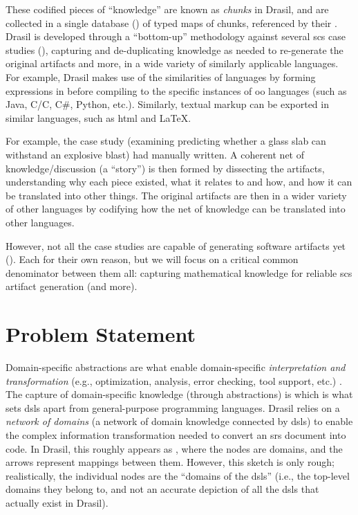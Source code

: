 
These codified pieces of ``knowledge'' are known as \textit{chunks} in Drasil,
and are collected in a single database () of typed
maps of chunks, referenced by their . Drasil is developed through a
``bottom-up'' methodology against several \acs{scs} case studies
(), capturing and de-duplicating knowledge as needed to
re-generate the original artifacts and more, in a wide variety of similarly
applicable languages. For example, Drasil makes use of the similarities of
 languages by forming expressions in  before compiling to the
specific instances of \acs{oo} languages (such as Java, C/C\+\+, C\#, Python,
etc.). Similarly, textual markup can be exported in similar languages, such as
\acs{html} and \LaTeX{}.

For example, the  case study (examining predicting whether a glass
slab can withstand an explosive blast) had 
manually written. A coherent net of knowledge/discussion (a ``story'') is then
formed by dissecting the artifacts, understanding why each piece existed, what
it relates to and how, and how it can be translated into other things. The
original artifacts are then
in a wider variety of other languages by codifying how the net of knowledge can
be translated into other languages.

However, not all the case studies are capable of generating software artifacts
yet (). Each for their own reason, but we will focus
on a critical common denominator between them all: capturing mathematical
knowledge for reliable \acs{scs} artifact generation (and more).

\section{Problem Statement}
\label{sec:intro:problemStatement}

Domain-specific abstractions are what enable domain-specific
\textit{interpretation and transformation} (e.g., optimization, analysis, error
checking, tool support, etc.) \cite{Czarnecki2005}. The capture of
domain-specific knowledge (through abstractions) is which is what sets
\acsp{dsl} apart from general-purpose programming languages. Drasil relies on a
\textit{network of domains} (a network of domain knowledge connected by
\aclp{dsl}) to enable the complex information transformation needed to convert
an \acs{srs} document into code. In Drasil, this roughly appears as
, where the nodes are domains, and the arrows
represent mappings between them. However, this sketch is only rough;
realistically, the individual nodes are the ``domains of the \aclp{dsl}'' (i.e.,
the top-level domains they belong to, and not an accurate depiction of all the
\aclp{dsl} that actually exist in Drasil).


